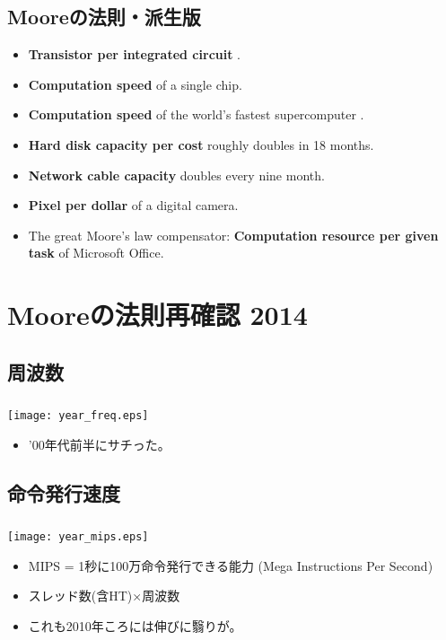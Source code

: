 \documentclass{beamer}  %
\theoremstyle{example}
\begin{document}
\subsection{Mooreの法則・派生版}
\begin{frame}
\begin{itemize}\frametitle{\insertsubsection}
\item {\bf Transistor per integrated circuit} .
\item {\bf Computation speed} of a single chip.
\item {\bf Computation speed} of the world's fastest supercomputer .
\item {\bf Hard disk capacity per cost} roughly doubles in 18 months.
\item {\bf Network cable capacity} doubles every nine month.
\item {\bf Pixel per dollar} of a digital camera.
\item The great Moore's law compensator: {\bf Computation resource per given task} of Microsoft Office.

\end{itemize} 
\end{frame}

\section{Mooreの法則再確認 2014}             %

\subsection{周波数} 
\begin{frame}\frametitle{\insertsubsection}
\begin{center}
\texttt{[image: year\_freq.eps]}
\end{center}
\pause
\begin{itemize}
\item '00年代前半にサチった。
\end{itemize}
\end{frame}


\subsection{命令発行速度}       
\begin{frame}\frametitle{\insertsubsection}
\begin{center}
\texttt{[image: year\_mips.eps]}
\end{center}
\pause
\begin{itemize}
\item MIPS = 1秒に100万命令発行できる能力 (Mega Instructions Per Second) \pause
\item スレッド数(含HT)×周波数 \pause 
\item これも2010年ころには伸びに翳りが。
\end{itemize}
\end{frame}
\end{document}
